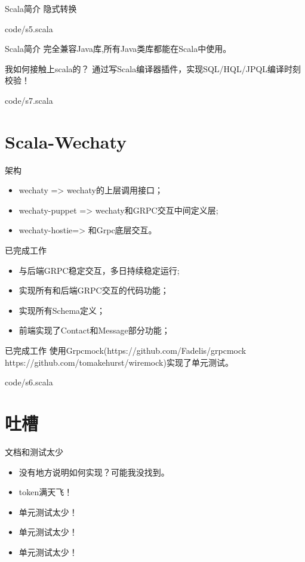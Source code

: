 \documentclass[10pt,aspectratio=43,mathserif,table]{beamer}
\begin{document}
\begin{frame}{Scala简介}
  隐式转换
  
  {code/s5.scala}
\end{frame}

\begin{frame}{Scala简介}
  完全兼容Java库,所有Java类库都能在Scala中使用。
\end{frame}
\begin{frame}{我如何接触上scala的？}
  通过写Scala编译器插件，实现SQL/HQL/JPQL编译时刻校验！
  
  {code/s7.scala}
\end{frame}


\section{Scala-Wechaty}
\begin{frame}{架构}
  \begin{itemize}
    \item<1-> wechaty => wechaty的上层调用接口；
    \item<1-> wechaty-puppet => wechaty和GRPC交互中间定义层;
    \item<1-> wechaty-hostie=> 和Grpc底层交互。
  \end{itemize}
\end{frame}
\begin{frame}{已完成工作}
  \begin{itemize}
    \item<1-> 与后端GRPC稳定交互，多日持续稳定运行;
    \item<1-> 实现所有和后端GRPC交互的代码功能；
    \item<1-> 实现所有Schema定义；
    \item<1-> 前端实现了Contact和Message部分功能；
  \end{itemize}
\end{frame}
\begin{frame}{已完成工作}
    使用Grpcmock(https://github.com/Fadelis/grpcmock https://github.com/tomakehurst/wiremock)实现了单元测试。
  
  {code/s6.scala}
\end{frame}

\section{吐槽}
\begin{frame}{文档和测试太少}
  \begin{itemize}
    \item<1-> 没有地方说明如何实现？可能我没找到。
    \item<1-> token满天飞！
    \item<1-> 单元测试太少！
    \item<1-> 单元测试太少！
    \item<1-> 单元测试太少！
  \end{itemize}
\end{frame}
\end{document}
